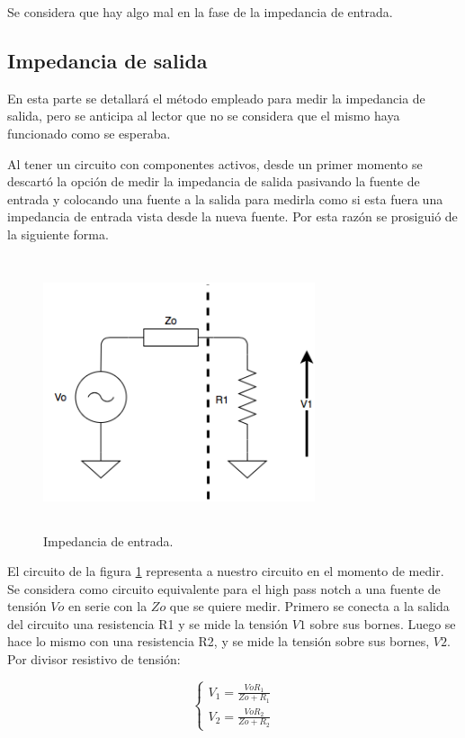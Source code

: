 Se considera que hay algo mal en la fase de la impedancia de entrada.

\subsection{Impedancia de salida}

En esta parte se detallar\'a el m\'etodo empleado para medir la impedancia de salida, pero se anticipa al lector que no se considera que el mismo haya funcionado como se esperaba. 

Al tener un circuito con componentes activos, desde un primer momento se descart\'o la opci\'on de medir la impedancia de salida pasivando la fuente de entrada y colocando una fuente a la salida para medirla como si esta fuera una impedancia de entrada vista desde la nueva fuente. Por esta raz\'on se prosigui\'o de la siguiente forma.

\begin{figure}[H] %
	\centering
	\includegraphics[width=8cm,height=8cm,keepaspectratio]{../EJ1/00GRAFICOS/zout.png}
	\caption{Impedancia de entrada.}
	\label{zout}
\end{figure}

El circuito de la figura \ref{zout} representa a nuestro circuito en el momento de medir. Se considera como circuito equivalente para el high pass notch a una fuente de tensi\'on $Vo$ en serie con la $Zo$ que se quiere medir. Primero se conecta a la salida del circuito una resistencia R1 y se mide la tensi\'on $V1$ sobre sus bornes. Luego se hace lo mismo con una resistencia R2, y se mide la tensi\'on sobre sus bornes, $V2$. Por divisor resistivo de tensi\'on:

\begin{equation}
\begin{cases}
V_1 = \frac{Vo R_1}{Zo + R_1}\\
V_2 = \frac{Vo R_2}{Zo + R_2}
\end{cases}
\label{v1v2}
\end{equation}

